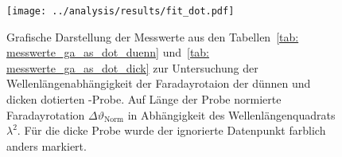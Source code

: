 









\begin{figure}
\centering
\texttt{[image: ../analysis/results/fit\_dot.pdf]}
\caption{Grafische Darstellung der Messwerte aus den Tabellen~\ref{tab: messwerte_ga_as_dot_duenn} und~\ref{tab: messwerte_ga_as_dot_dick} 
zur Untersuchung der 
Wellenlängenabhängigkeit der Faradayrotaion der dünnen und dicken dotierten -Probe. Auf Länge der Probe normierte 
Faradayrotation $\Delta \vartheta_{\text{Norm}}$ in Abhängigkeit des Wellenlängenquadrats $\lambda^2$. Für die dicke Probe 
wurde der ignorierte Datenpunkt farblich anders markiert.}
\label{fig: ga_as_dot}
\end{figure}